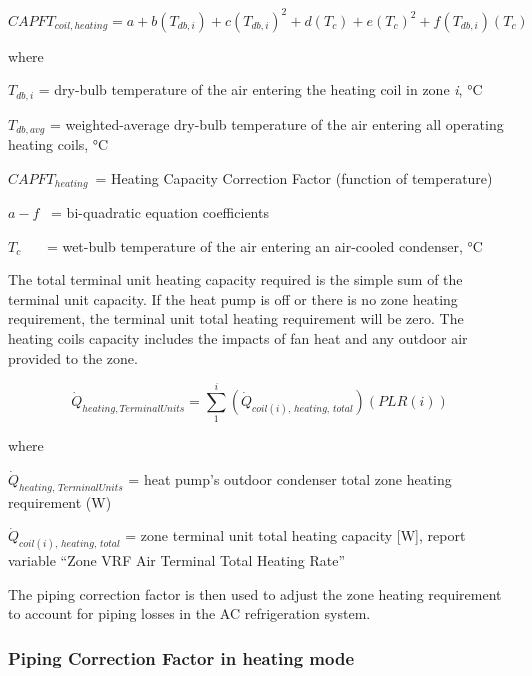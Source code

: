 \begin{equation}
  CAPFT_{coil,heating} = a + b \left( T_{db,i} \right) + c \left( T_{db,i} \right)^2 + d \left( T_c \right) + e \left( T_c \right)^2 + f \left( T_{db,i} \right) \left( T_c \right)
\end{equation}

where

\(T_{db,i}\) = dry-bulb temperature of the air entering the heating coil in zone \emph{i}, °C

\(T_{db,avg}\) = weighted-average dry-bulb temperature of the air entering all operating heating coils, °C

\(CAPFT_{heating}\) = Heating Capacity Correction Factor (function of temperature)

\(a - f\)  = bi-quadratic equation coefficients

\(T_c\)    = wet-bulb temperature of the air entering an air-cooled condenser, °C

The total terminal unit heating capacity required is the simple sum of the terminal unit capacity. If the heat pump is off or there is no zone heating requirement, the terminal unit total heating requirement will be zero. The heating coils capacity includes the impacts of fan heat and any outdoor air provided to the zone.

\begin{equation}
  \dot{Q}_{heating,TerminalUnits} = \sum\limits_1^i \left( \dot{Q}_{coil(i),\,heating,\,total} \right) \left( PLR(i) \right)
\end{equation}

where

\(\dot{Q}_{heating,\,TerminalUnits}\) = heat pump's outdoor condenser total zone heating requirement (W)

\(\dot{Q}_{coil(i),\,heating,\,total}\) = zone terminal unit total heating capacity [W], report variable ``Zone VRF Air Terminal Total Heating Rate''

The piping correction factor is then used to adjust the zone heating requirement to account for piping losses in the AC refrigeration system.

\subsubsection{Piping Correction Factor in heating mode}\label{piping-correction-factor-in-heating-mode}

